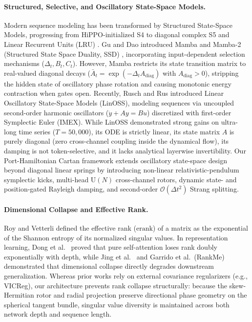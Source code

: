 \documentclass[11pt,a4paper]{article}
\begin{document}
\paragraph{Structured, Selective, and Oscillatory State-Space Models.}
Modern sequence modeling has been transformed by Structured State-Space Models, progressing from HiPPO-initialized S4 \cite{gu2022efficiently} to diagonal complex S5 \cite{smith2023simplified} and Linear Recurrent Units (LRU) \cite{orvieto2023resurrecting}. Gu and Dao introduced Mamba \cite{gu2023mamba} and Mamba-2 (Structured State Space Duality, SSD) \cite{dao2024transformers}, incorporating input-dependent selection mechanisms ($\Delta_t, B_t, C_t$). However, Mamba restricts its state transition matrix to real-valued diagonal decays ($\bar{A}_t = \exp(-\Delta_t A_{\text{diag}})$ with $A_{\text{diag}} > 0$), stripping the hidden state of oscillatory phase rotation and causing monotonic energy contraction when gates open. Recently, Rusch and Rus \cite{rusch2024oscillatory} introduced Linear Oscillatory State-Space Models (LinOSS), modeling sequences via uncoupled second-order harmonic oscillators ($\ddot{y} + A y = B u$) discretized with first-order Symplectic Euler (IMEX). While LinOSS demonstrated strong gains on ultra-long time series ($T=50,000$), its ODE is strictly linear, its state matrix $A$ is purely diagonal (zero cross-channel coupling inside the dynamical flow), its damping is not token-selective, and it lacks analytical layerwise invertibility. Our Port-Hamiltonian Cartan framework extends oscillatory state-space design beyond diagonal linear springs by introducing non-linear relativistic-pendulum symplectic kicks, multi-head $\mathrm{U}(N)$ cross-channel rotors, dynamic state- and position-gated Rayleigh damping, and second-order $\mathcal{O}(\Delta t^2)$ Strang splitting.

\paragraph{Dimensional Collapse and Effective Rank.}
Roy and Vetterli \cite{roy2007effective} defined the effective rank ($\mathrm{erank}$) of a matrix as the exponential of the Shannon entropy of its normalized singular values. In representation learning, Dong et al.\ \cite{dong2021attention} proved that pure self-attention loses rank doubly exponentially with depth, while Jing et al.\ \cite{jing2022understanding} and Garrido et al.\ (RankMe) \cite{garrido2023rankme} demonstrated that dimensional collapse directly degrades downstream generalization. Whereas prior works rely on external covariance regularizers (e.g., VICReg), our architecture prevents rank collapse structurally: because the skew-Hermitian rotor and radial projection preserve directional phase geometry on the spherical tangent bundle, singular value diversity is maintained across both network depth and sequence length.
\end{document}
